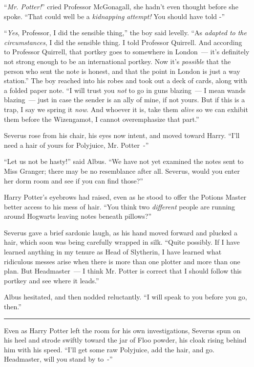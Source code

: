 ``\emph{Mr. Potter!}'' cried Professor McGonagall, she hadn't even thought before she spoke. ``That could well be a \emph{kidnapping attempt!} You should have told -''

``\emph{Yes}, Professor, I did the sensible thing,'' the boy said levelly. ``As \emph{adapted to the circumstances}, I did the sensible thing. I told Professor Quirrell. And according to Professor Quirrell, that portkey goes to somewhere in London~--- it's definitely not strong enough to be an international portkey. Now it's \emph{possible} that the person who sent the note is honest, and that the point in London is just a way station.'' The boy reached into his robes and took out a deck of cards, along with a folded paper note. ``I will trust you \emph{not} to go in guns blazing~--- I mean wands blazing~--- just in case the sender is an ally of mine, if not yours. But if this is a trap, I say we spring it \emph{now}. And whoever it is, take them \emph{alive} so we can exhibit them before the Wizengamot, I cannot overemphasize that part.''

Severus rose from his chair, his eyes now intent, and moved toward Harry. ``I'll need a hair of yours for Polyjuice, Mr. Potter~-''

``Let us not be hasty!'' said Albus. ``We have not yet examined the notes sent to Miss Granger; there may be no resemblance after all. Severus, would you enter her dorm room and see if you can find those?''

Harry Potter's eyebrows had raised, even as he stood to offer the Potions Master better access to his mess of hair. ``You think two \emph{different} people are running around Hogwarts leaving notes beneath pillows?''

Severus gave a brief sardonic laugh, as his hand moved forward and plucked a hair, which soon was being carefully wrapped in silk. ``Quite possibly. If I have learned anything in my tenure as Head of Slytherin, I have learned what ridiculous messes arise when there is more than one plotter and more than one plan. But Headmaster~--- I think Mr. Potter is correct that I should follow this portkey and see where it leads.''

Albus hesitated, and then nodded reluctantly. ``I will speak to you before you go, then.''

\begin{center}\rule{3in}{0.4pt}\end{center}

Even as Harry Potter left the room for his own investigations, Severus spun on his heel and strode swiftly toward the jar of Floo powder, his cloak rising behind him with his speed. ``I'll get some raw Polyjuice, add the hair, and go. Headmaster, will you stand by to~-''

